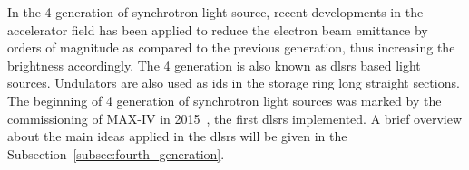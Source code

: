 In the 4 generation of synchrotron light source, recent developments in the accelerator field has been applied to reduce the electron beam emittance by orders of magnitude as compared to the previous generation, thus increasing the brightness accordingly. The 4 generation is also known as \glspl{dlsr} based light sources. Undulators are also used as \glspl{id} in the storage ring long straight sections. The beginning of 4 generation of synchrotron light sources was marked by the commissioning of MAX-IV in 2015~\cite{eriksson2016}, the first \glspl{dlsr} implemented. A brief overview about the main ideas applied in the \glspl{dlsr} will be given in the Subsection~\ref{subsec:fourth_generation}.
